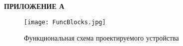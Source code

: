 \newpage
\begin{center}
  \textbf{\large ПРИЛОЖЕНИЕ А}
\end{center}

 \begin{figure}[!ht]
        \centering
        \texttt{[image: FuncBlocks.jpg]}
        \caption{Функциональная схема проектируемого устройства}
        \label{FuncBlocks}
    \end{figure}



    

    


\clearpage
%     


%     



\clearpage
